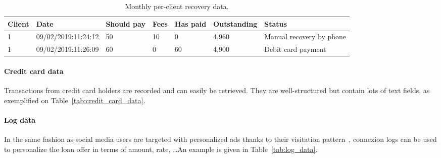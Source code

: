 \begin{table}[ht]
    \centering
    \caption{Monthly per-client recovery data.}
    \label{tab:recovery_data}
    \begin{small}
\begin{tabular}{lllllll}
Client & Date & Should pay & Fees & Has paid & Outstanding & Status \\
 \hline
1 & 09/02/2019:11:24:12 & 50 & 10 & 0 & 4{,}960 & Manual recovery by phone \\
1 & 09/02/2019:11:26:09 & 60 & 0 & 60 & 4{,}900 & Debit card payment \\
\end{tabular}
    \end{small}
\end{table}

\paragraph{Credit card data}

Transactions from credit card holders are recorded and can easily be retrieved. They are well-structured but contain lots of text fields, as exemplified on Table~\ref{tab:credit_card_data}.

\begin{table}[ht]
    \centering
    \caption{Daily per-client credit card data.}
    \label{tab:credit_card_data}
\begin{tiny}
\end{tiny}
\end{table}


\paragraph{Log data}

In the same fashion as social media users are targeted with personalized ads thanks to their visitation pattern~\cite{Yan:2017:YAY:3109859.3109923}, connexion logs can be used to personalize the loan offer in terms of amount, rate, \dots An example is given in Table~\ref{tab:log_data}.

